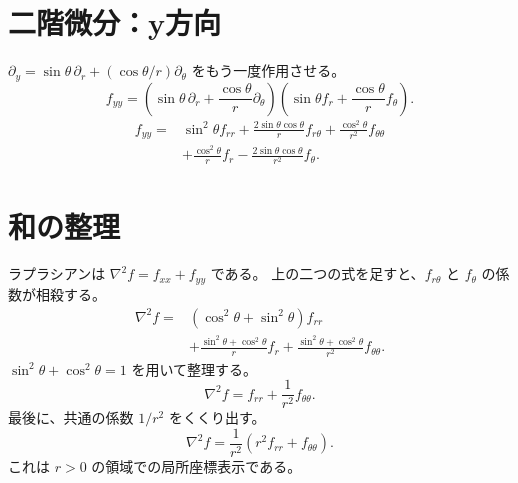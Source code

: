 \documentclass[a4paper,10pt]{ltjsarticle}
\begin{document}
\section*{二階微分：y方向}
$\partial_y=\sin\theta\,\partial_r+(\cos\theta/r)\partial_\theta$ をもう一度作用させる。
\begin{equation}
 f_{yy}=\left(\sin\theta\,\partial_r+\frac{\cos\theta}{r}\partial_\theta\right)
 \left(\sin\theta f_r+\frac{\cos\theta}{r}f_\theta\right). \label{dyy-operator}
\end{equation}
\begin{equation}
 \begin{aligned}
 f_{yy}={}&\sin^2\theta f_{rr}+\frac{2\sin\theta\cos\theta}{r}f_{r\theta}
              +\frac{\cos^2\theta}{r^2}f_{\theta\theta}\\
          &+\frac{\cos^2\theta}{r}f_r-\frac{2\sin\theta\cos\theta}{r^2}f_\theta.
 \end{aligned}\label{dyy-expanded}
\end{equation}
\section*{和の整理}
ラプラシアンは $\nabla^2 f=f_{xx}+f_{yy}$ である。
上の二つの式を足すと、$f_{r\theta}$ と $f_\theta$ の係数が相殺する。
\begin{equation}
 \begin{aligned}
 \nabla^2 f={}&(\cos^2\theta+\sin^2\theta)f_{rr}\\
 &+\frac{\sin^2\theta+\cos^2\theta}{r}f_r
 +\frac{\sin^2\theta+\cos^2\theta}{r^2}f_{\theta\theta}.
 \end{aligned}\label{lap-sum}
\end{equation}
$\sin^2\theta+\cos^2\theta=1$ を用いて整理する。
\begin{equation}
 \nabla^2 f=f_{rr}+\frac{1}{r^2}f_{\theta\theta}. \label{lap-simplified}
\end{equation}
最後に、共通の係数 $1/r^2$ をくくり出す。
\begin{equation}
 \nabla^2 f=\frac{1}{r^2}\left(r^2 f_{rr}+f_{\theta\theta}\right). \label{lap-factored}
\end{equation}
これは $r>0$ の領域での局所座標表示である。
\end{document}
